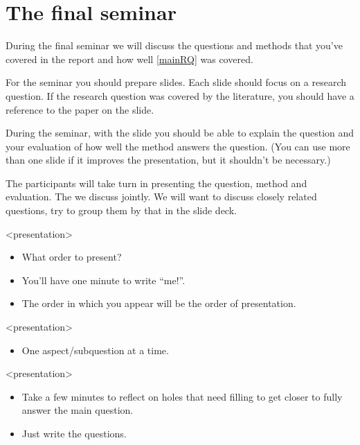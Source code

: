 \section{The final seminar}

During the final seminar we will discuss the questions and methods that you've 
covered in the report and how well \cref{mainRQ} was covered.

For the seminar you should prepare slides.
Each slide should focus on a research question.
If the research question was covered by the literature, you should have a 
reference to the paper on the slide.

During the seminar, with the slide you should be able to explain the question 
and your evaluation of how well the method answers the question.
(You can use more than one slide if it improves the presentation, but it 
shouldn't be necessary.)

The participants will take turn in presenting the question, method and 
evaluation.
The we discuss jointly.
We will want to discuss closely related questions, try to group them by that in 
the slide deck.

\begin{frame}<presentation>
  \begin{activity}[Order]
    \begin{itemize}
      \item What order to present?
      \item You'll have one minute to write \enquote{me!}.
      \item The order in which you appear will be the order of presentation.
    \end{itemize}
  \end{activity}
\end{frame}

\begin{frame}<presentation>
  \mainRQ*
  \begin{activity}
    \begin{itemize}
      \item One aspect/subquestion at a time.
    \end{itemize}
  \end{activity}
\end{frame}

\begin{frame}<presentation>
  \begin{activity}
    \begin{itemize}
      \item Take a few minutes to reflect on holes that need filling to get 
        closer to fully answer the main question.
      \item Just write the questions.
    \end{itemize}
  \end{activity}
\end{frame}

